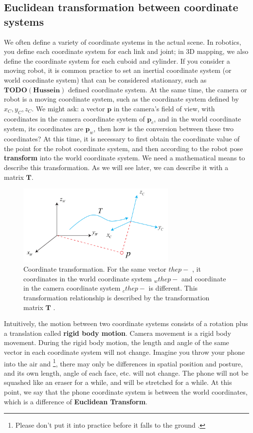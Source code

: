 \subsection{Euclidean transformation between coordinate systems}
We often define a variety of coordinate systems in the actual scene. In robotics, you define each coordinate system for each link and joint; in 3D mapping, we also define the coordinate system for each cuboid and cylinder. If you consider a moving robot, it is common practice to set an inertial coordinate system (or world coordinate system) that can be considered stationary, such as 
$ \bm{TODO(Hussein)} $ defined coordinate system. At the same time, the camera or robot is a moving coordinate system, such as the coordinate system defined by $x_C, y_C, z_C$. We might ask: a vector $\bm{p}$ in the camera's field of view, with coordinates in the camera coordinate system of $\bm{p}_c$, and in the world coordinate system, its coordinates are $ \bm{p}_w$, then how is the conversion between these two coordinates? At this time, it is necessary to first obtain the coordinate value of the point for the robot coordinate system, and then according to the robot pose \textbf{transform} into the world coordinate system. We need a mathematical means to describe this transformation. As we will see later, we can describe it with a matrix $\bm{T}$.

\begin{figure}[!htp]
	\centering
  	\includegraphics[width=0.7\textwidth]{rigidMotion/axisTransform.pdf}
	\caption {Coordinate transformation. For the same vector $ \bm{} the p- $ , it coordinates in the world coordinate system $ \bm{} _w the p- $ and coordinate in the camera coordinate system $ \bm{} _c the p- $ is different. This transformation relationship is described by the transformation matrix $ \bm{T} $ . }
	\label{fig:axisTransform}
\end{figure}

Intuitively, the motion between two coordinate systems consists of a rotation plus a translation called \textbf {rigid body motion}. Camera movement is a rigid body movement. During the rigid body motion, the length and angle of the same vector in each coordinate system will not change. Imagine you throw your phone into the air and \footnote {Please don't put it into practice before it falls to the ground . }, there may only be differences in spatial position and posture, and its own length, angle of each face, etc. will not change. The phone will not be squashed like an eraser for a while, and will be stretched for a while. At this point, we say that the phone coordinate system is between the world coordinates, which is a difference of \textbf {Euclidean Transform}.

